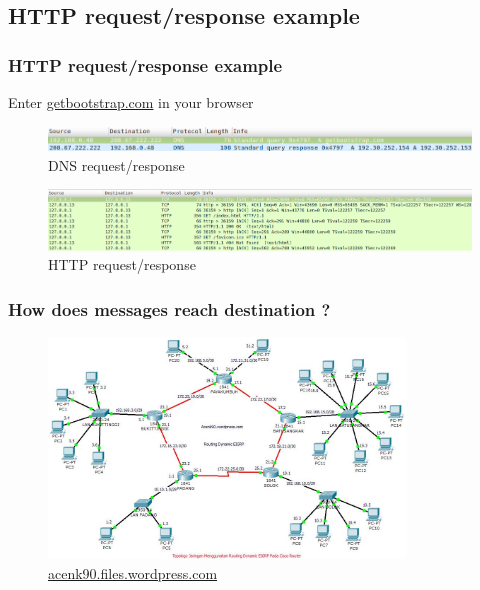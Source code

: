 \subsection{HTTP request/response example}
\begin{frame}
    \frametitle{HTTP request/response example}
      Enter \color{blue}\href{http://getbootstrap.com}{getbootstrap.com} \color{black} in your browser\pause
      \begin{figure}
	  \includegraphics[width=11.5cm]{./imgs/dns-req.png}
	\caption{DNS request/response}
      \end{figure}
      \pause
      \begin{figure}
	  \includegraphics[width=13cm]{./imgs/http-req.png}
	\caption{HTTP request/response}
      \end{figure}
  \end{frame}
    \begin{frame}
    \frametitle{How does messages reach destination ?}
      \begin{figure}
    \includegraphics[width=9.5cm]{./imgs/routing.jpg}
  \caption{\color{blue}\href{http://acenk90.files.wordpress.com}{acenk90.files.wordpress.com}}
  \label{fig:routing}
      \end{figure}
  \end{frame}
